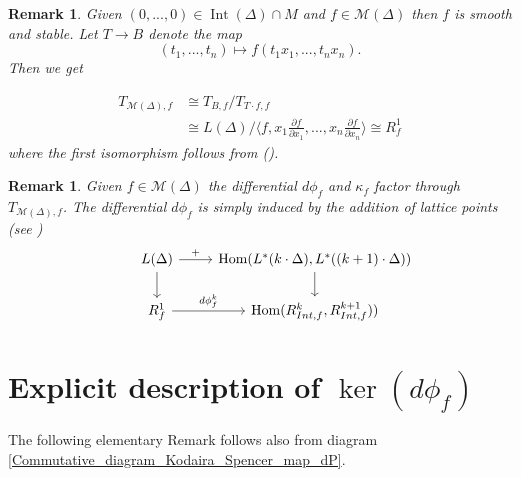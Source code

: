 \documentclass[12pt, english]{article}
\newtheorem{remark}[definition]{Remark}
\DeclareMathOperator{\Hom}{Hom}
\DeclareMathOperator{\Int}{Int}
\begin{document}
\begin{remark} \label{remark_tangent_space_M(Delta)}
	\normalfont
	Given $(0,...,0) \in \Int(\Delta) \cap M$ and $f \in \mathcal{M}(\Delta)$ then $f$ is smooth and stable. Let $T \rightarrow B$ denote the map
	\[ (t_1,...,t_n) \mapsto f(t_1x_1,...,t_n x_n).  \]
	Then we get

	\begin{align*}
		T_{\mathcal{M}(\Delta),f} &\cong T_{B,f}/T_{T \cdot f, f} \\
		&\cong L(\Delta)/ \langle f,  x_1 \frac{\partial f}{\partial x_1},..., x_n \frac{\partial f}{\partial x_n} \rangle \cong R_{f}^1
	\end{align*} 
	where the first isomorphism follows from (\cite[Cor.11.3]{Bat93}).
\end{remark}


\begin{remark}
	\normalfont
	Given $f \in \mathcal{M}(\Delta)$ the differential $d \phi_f$ and $\kappa_f$ factor through $T_{\mathcal{M}(\Delta),f}$. The differential $d \phi_f$ is simply induced by the addition of lattice points (see \cite[Prop.11.8]{Bat93})
	\begin{equation}
		\begin{tikzcd}
			& L(\Delta) \arrow{r}{+} \arrow{d} &  \Hom(L^*(k \cdot \Delta), L^*((k+1) \cdot \Delta)) \arrow{d} \\
			& R_f^1 \arrow{r}{d \phi_f^k} & \Hom(R_{Int,f}^k, R_{Int,f}^{k+1}))
		\end{tikzcd}
	\end{equation}
\end{remark}






\section{Explicit description of $\ker(d \phi_{f})$}





The following elementary Remark follows also from diagram \ref{Commutative_diagram_Kodaira_Spencer_map_dP}.
\end{document}
